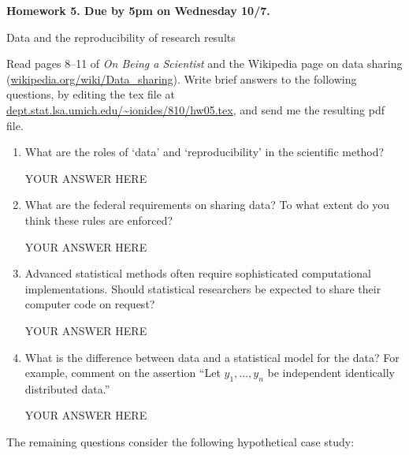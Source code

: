\documentclass[12pt]{article}
\begin{document}
\begin{center}\bf
Homework 5. Due by 5pm on Wednesday 10/7.

Data and the reproducibility of research results
\end{center}
Read pages 8--11 of {\em On Being a Scientist} and the Wikipedia page on data sharing (\url{wikipedia.org/wiki/Data_sharing}). Write brief answers to the following questions, by editing the tex file at \url{dept.stat.lsa.umich.edu/~ionides/810/hw05.tex}, and send me the resulting pdf file. 

\begin{enumerate}

\item What are the roles of `data' and `reproducibility' in the scientific method? 

YOUR ANSWER HERE

\item What are the federal requirements on sharing data? To what extent do you think these rules are enforced?

YOUR ANSWER HERE

\item Advanced statistical methods often require sophisticated computational implementations. Should statistical researchers be expected to share their computer code on request?

YOUR ANSWER HERE

\item What is the difference between data and a statistical model for the data? For example, comment on the assertion ``Let $y_1,\dots,y_n$ be independent identically distributed data.''

YOUR ANSWER HERE
\end{enumerate}
The remaining questions consider the following hypothetical case study:
\end{document}
